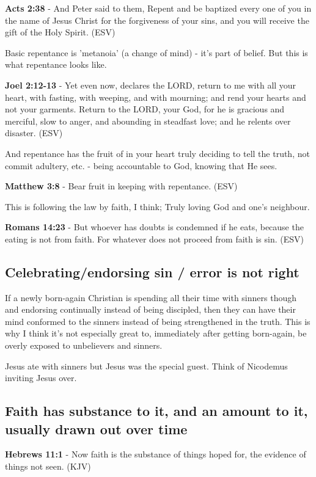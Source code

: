 \documentclass[11pt]{article}
\begin{document}
\textbf{Acts 2:38} - And Peter said to them, Repent and be baptized every one of you in the name of Jesus Christ for the forgiveness of your sins, and you will receive the gift of the Holy Spirit. (ESV)

Basic repentance is 'metanoia' (a change of mind) - it's part of belief.
But this is what repentance looks like.

\textbf{Joel 2:12-13} - Yet even now, declares the LORD, return to me with all your heart, with fasting, with weeping, and with mourning; and rend your hearts and not your garments. Return to the LORD, your God, for he is gracious and merciful, slow to anger, and abounding in steadfast love; and he relents over disaster. (ESV)

And repentance has the fruit of in your heart truly deciding to tell the truth, not commit adultery, etc. - being accountable to God, knowing that He sees.

\textbf{Matthew 3:8} - Bear fruit in keeping with repentance. (ESV)

This is following the law by faith, I think; Truly loving God and one's neighbour.

\textbf{Romans 14:23} - But whoever has doubts is condemned if he eats, because the eating is not from faith. For whatever does not proceed from faith is sin. (ESV)

\subsection{Celebrating/endorsing sin / error is not right}
\label{sec:orgf872210}

If a newly born-again Christian is spending all their time with sinners though and endorsing continually instead of being discipled, then they can
have their mind conformed to the sinners instead of being strengthened in the truth. This is why I think it's not especially great to, immediately after getting born-again,
be overly exposed to unbelievers and sinners.

Jesus ate with sinners but Jesus was the special guest. Think of Nicodemus inviting Jesus over.

\subsection{Faith has substance to it, and an amount to it, usually drawn out over time}
\label{sec:orgba86b11}
\textbf{Hebrews 11:1} - Now faith is the substance of things hoped for, the evidence of things not seen. (KJV)
\end{document}
